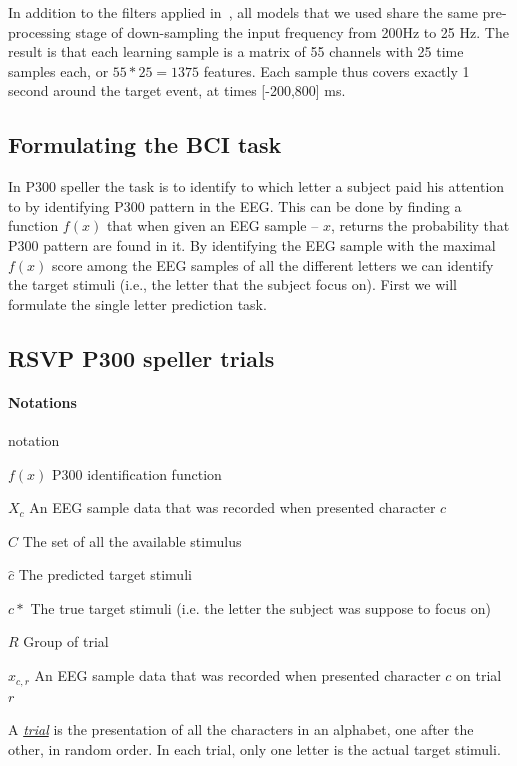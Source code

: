 \documentclass[
12pt, %
english, %
doublespacing, %
headsepline, %
]{MastersDoctoralThesis} %
\begin{document}
In addition to the filters applied in~\cite{BlaknertzExperiment}, all models that we used share the same pre-processing stage of down-sampling the input frequency from 200Hz to 25 Hz. The result is that each learning sample is a matrix of 55 channels with 25 time samples each, or $55*25 = 1375$ features. Each sample thus covers exactly 1 second around the target event, at times [-200,800] ms.

\subsection{Formulating the BCI task}
In P300 speller the task is to identify to which letter a subject paid his attention to by identifying P300 pattern in the EEG. This can be done by finding a function $f(x)$ that when given an EEG sample – $x$, returns the probability that P300 pattern are found in it. By identifying the EEG sample with the maximal $f(x)$ score among the EEG samples of all the different letters we can identify the target stimuli (i.e., the letter that the subject focus on). First we will formulate the single letter prediction task.

\subsection{RSVP P300 speller trials}

\paragraph{Notations}
\begin{labeling}{notation}
	\item [$f(x)$] P300 identification function
	\item [$X_c$] An EEG sample data that was recorded when presented character $c$
	\item [$C$] The set of all the available stimulus 
	\item [$\hat{c}$] The predicted target stimuli
	\item [$c*$] The true target stimuli (i.e. the letter the subject was suppose to focus on)	
	\item [$R$] Group of trial
	\item [$x_{c,r}$] An EEG sample data that was recorded when presented character $c$ on trial $r$
\end{labeling}

A \underline{\textit{trial}} is the presentation of all the characters in an alphabet, one after the other, in random order. In each trial, only one letter is the actual target stimuli.  
\end{document}
